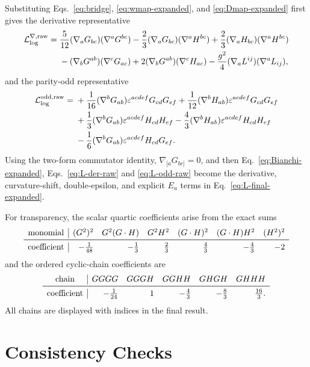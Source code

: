 \documentclass[11pt]{article}
\newcommand{\cL}{\mathcal L}
\newcommand{\eps}{\varepsilon}
\newcommand{\Log}{\log}
\begin{document}
Substituting Eqs.~\eqref{eq:bridge}, \eqref{eq:wmap-expanded}, and
\eqref{eq:Dmap-expanded} first gives the derivative representative
\begin{align}
\cL_{\Log}^{\nabla,\rm raw}={}&
\frac5{12}(\nabla_aG_{bc})(\nabla^aG^{bc})
-\frac23(\nabla_aG_{bc})(\nabla^aH^{bc})
+\frac23(\nabla_aH_{bc})(\nabla^aH^{bc})
\nonumber\\
&-(\nabla_bG^{ab})(\nabla^cG_{ac})
+2(\nabla_bG^{ab})(\nabla^cH_{ac})
-\frac{g^2}{4}(\nabla_aL^{ij})(\nabla^aL_{ij}),
\label{eq:L-der-raw}
\end{align}
and the parity-odd representative
\begin{align}
\cL_{\Log}^{\rm odd,raw}={}&
+\frac1{16}(\nabla^bG_{ab})\eps^{acdef}G_{cd}G_{ef}
+\frac1{12}(\nabla^bH_{ab})\eps^{acdef}G_{cd}G_{ef}
\nonumber\\
&+\frac13(\nabla^bG_{ab})\eps^{acdef}H_{cd}H_{ef}
-\frac43(\nabla^bH_{ab})\eps^{acdef}H_{cd}H_{ef}
\nonumber\\
&-\frac16(\nabla^bG_{ab})\eps^{acdef}H_{cd}G_{ef}.
\label{eq:L-odd-raw}
\end{align}
Using the two-form commutator identity, $\nabla_{[a}G_{bc]}=0$, and then
Eq.~\eqref{eq:Bianchi-expanded}, Eqs.~\eqref{eq:L-der-raw} and
\eqref{eq:L-odd-raw} become the derivative, curvature-shift, double-epsilon,
and explicit $E_a$ terms in Eq.~\eqref{eq:L-final-expanded}.

For transparency, the scalar quartic coefficients arise from the exact sums
\begin{equation}
\begin{array}{c|rrrrrr}
\text{monomial}&(G^2)^2&G^2(G\cdot H)&G^2H^2&(G\cdot H)^2&(G\cdot H)H^2&(H^2)^2\\
\midrule
\text{coefficient}&-\frac1{48}&-\frac13&\frac23&\frac43&-\frac43&-2
\end{array}
\label{eq:L-scalar-ledger}
\end{equation}
and the ordered cyclic-chain coefficients are
\begin{equation}
\begin{array}{c|rrrrr}
\text{chain}&GGGG&GGGH&GGHH&GHGH&GHHH\\
\midrule
\text{coefficient}&-\frac1{24}&1&-\frac43&-\frac83&\frac{16}{3}.
\end{array}
\label{eq:L-trace-ledger}
\end{equation}
All chains are displayed with indices in the final result.

\section{Consistency Checks}
\end{document}
